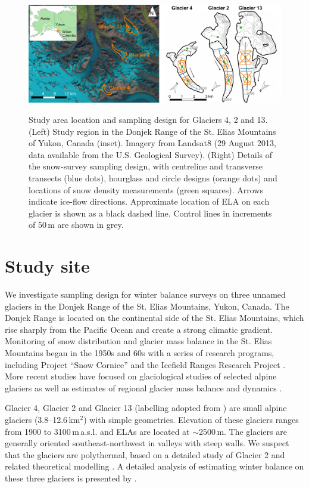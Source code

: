 \documentclass[twocolumn,letterpaper]{igs}
\begin{document}
\begin{figure}
	\centering
	\includegraphics[width =\textwidth]{PaperII-StudySite.pdf}\\
	\caption{Study area location and sampling design for Glaciers 4, 2 and 13. (Left) Study region in the Donjek Range of the St. Elias Mountains of Yukon, Canada (inset). Imagery from Landsat8 (29 August 2013, data available from the U.S. Geological Survey). (Right) Details of the snow-survey sampling design, with centreline and transverse transects (blue dots), hourglass and circle designs (orange dots) and locations of snow density measurements (green squares). Arrows indicate ice-flow directions. Approximate location of ELA on each glacier is shown as a black dashed line. Control lines in increments of 50\,m are shown in grey.}
	\label{fig:Sampling}
\end{figure}

\section{Study site}

We investigate sampling design for winter balance surveys on three unnamed glaciers in the Donjek Range of the St. Elias Mountains, Yukon, Canada. The Donjek Range is located on the continental side of the St. Elias Mountains, which rise sharply from the Pacific Ocean and create a strong climatic gradient. Monitoring of snow distribution and glacier mass balance in the St. Elias Mountains began in the 1950s and 60s with a series of research programs, including Project ``Snow Cornice''  and the Icefield Ranges Research Project \citep{Wood1948, Danby2003}. More recent studies have focused on glaciological studies of selected alpine glaciers \citep[e.g.][]{Clarke2014} as well as estimates of regional glacier mass balance and dynamics \citep[e.g.][]{Arendt2008, Burgess2013,Waechter2015}. 

Glacier 4, Glacier 2 and Glacier 13 (labelling adopted from \cite{Crompton2016}) are small alpine glaciers (3.8--12.6\,km$^2$) with simple geometries. Elevation of these glaciers ranges from 1900 to 3100\,m\,a.s.l. and ELAs are located at $\sim$2500\,m. The glaciers are generally oriented southeast-northwest in valleys with steep walls. We suspect that the glaciers are polythermal, based on a detailed study of Glacier 2 \citep{Wilson2013} and related theoretical modelling \citep{Wilson2013a}. A detailed analysis of estimating winter balance on these three glaciers is presented by \cite{Pulwicki2017}.
\end{document}
